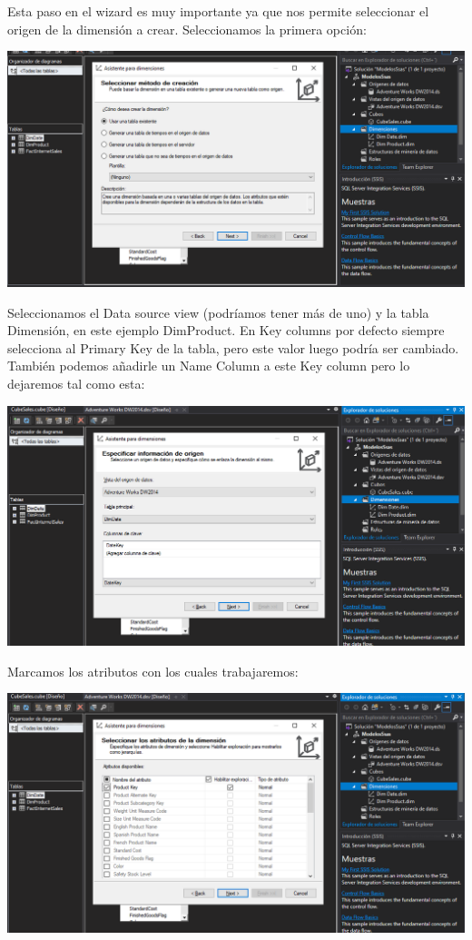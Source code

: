 Esta paso en el wizard es muy importante ya que nos permite seleccionar el origen de la dimensión a crear. 
Seleccionamos la primera opción:
\begin{center}
\includegraphics[width=\columnwidth]{images/task1/3}\newline
\end{center}

Seleccionamos el Data source view (podríamos tener más de uno) y la tabla Dimensión, en este ejemplo DimProduct. En Key columns por defecto siempre selecciona al Primary Key de la tabla, pero este valor luego podría ser cambiado. También podemos añadirle un Name Column a este Key column pero lo dejaremos tal como esta:
\begin{center}
\includegraphics[width=\columnwidth]{images/task1/4}\newline
\end{center}

Marcamos los atributos con los cuales trabajaremos:
\begin{center}
\includegraphics[width=\columnwidth]{images/task1/5}\newline
\end{center}

